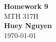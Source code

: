 \begin{titlepage}
    \begin{center}
        {\fontsize{40}{48}\selectfont \bfseries Homework 9}
        \\\vspace{20pt}
        {\LARGE MTH 317H} \\
        \vspace{20pt}
        \textbf{Huey Nguyen}
        \vspace{8pt}
        \\\today
    \end{center}
\end{titlepage}